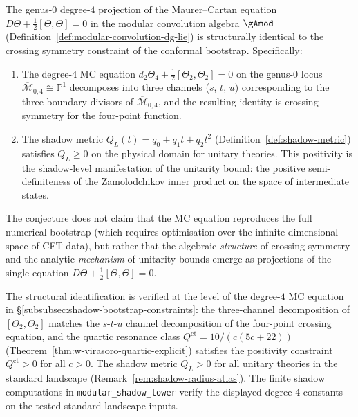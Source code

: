 \begin{conjecture}
\label{conj:mc-conformal-bootstrap}
\ClaimStatusConjectured
{}
The genus-$0$ degree-$4$ projection of the Maurer--Cartan
equation $D\Theta + \tfrac{1}{2}[\Theta, \Theta] = 0$ in
the modular convolution algebra
$\gAmod$
\textup{(}Definition~\textup{\ref{def:modular-convolution-dg-lie}})
is structurally identical to the crossing symmetry constraint
of the conformal bootstrap. Specifically:
\begin{enumerate}[label=\textup{(\roman*)}]
\item The degree-$4$ MC equation
 $d_2 \Theta_4 + \tfrac{1}{2}[\Theta_2, \Theta_2] = 0$
 on the genus-$0$ locus $\overline{\mathcal{M}}_{0,4}
 \cong \mathbb{P}^1$ decomposes into three channels
 \textup{(}$s$, $t$, $u$\textup{)} corresponding to the
 three boundary divisors of $\overline{\mathcal{M}}_{0,4}$,
 and the resulting identity is crossing symmetry for the
 four-point function.

\item The shadow metric $Q_L(t) = q_0 + q_1 t + q_2 t^2$
 \textup{(}Definition~\textup{\ref{def:shadow-metric}})
 satisfies $Q_L \geq 0$ on the physical domain for
 unitary theories. This positivity is the shadow-level
 manifestation of the unitarity bound: the positive
 semi-definiteness of the Zamolodchikov inner product on the
 space of intermediate states.
\end{enumerate}
The conjecture does not claim that the MC equation reproduces
the full numerical bootstrap \textup{(}which requires
optimisation over the infinite-dimensional space of CFT
data\textup{)}, but rather that the algebraic \emph{structure}
of crossing symmetry and the analytic \emph{mechanism} of
unitarity bounds emerge as projections of the single equation
$D\Theta + \tfrac{1}{2}[\Theta, \Theta] = 0$.
\end{conjecture}

\begin{remark}
\label{rem:mc-bootstrap-evidence}
The structural identification is verified at the level of
the degree-$4$ MC equation in
\S\ref{subsubsec:shadow-bootstrap-constraints}:
the three-channel decomposition of
$[\Theta_2, \Theta_2]$ matches the $s$-$t$-$u$ channel
decomposition of the four-point crossing equation, and
the quartic resonance class
$Q^{\mathrm{ct}} = 10/(c(5c{+}22))$
\textup{(}Theorem~\textup{\ref{thm:w-virasoro-quartic-explicit}})
satisfies the positivity constraint $Q^{\mathrm{ct}} > 0$
for all $c > 0$.
The shadow metric $Q_L > 0$ for all unitary theories
in the standard landscape
\textup{(}Remark~\textup{\ref{rem:shadow-radius-atlas}}).
The finite shadow computations in
\texttt{modular\_shadow\_tower} verify the displayed degree-$4$
constants on the tested standard-landscape inputs.
\end{remark}


